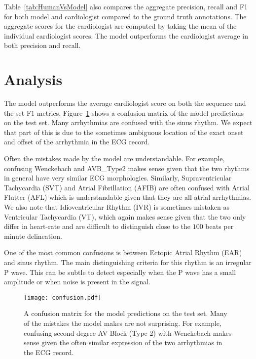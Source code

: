 \documentclass{article}
\begin{document}
Table~\ref{tab:HumanVsModel} also compares the aggregate precision, recall and F1 for both  model and cardiologist compared to the ground truth annotations. The aggregate scores for the cardiologist are computed by taking the mean of the individual cardiologist scores. The model outperforms the cardiologist average in both precision and recall.


\section{Analysis}
\label{analysis}
The model outperforms the average cardiologist score on both the sequence and the set F1 metrics. Figure~\ref{fig:confusion} shows a confusion matrix of the model predictions on the test set. Many arrhythmias are confused with the sinus rhythm. We expect that part of this is due to the sometimes ambiguous location of the exact onset and offset of the arrhythmia in the ECG record.

Often the mistakes made by the model are understandable. For example, confusing Wenckebach and AVB\_Type2 makes sense given that the two rhythms in general have very similar ECG morphologies. Similarly, Supraventricular Tachycardia (SVT) and Atrial Fibrillation (AFIB) are often confused with Atrial Flutter (AFL) which is understandable given that they are all atrial arrhythmias. We also note that Idioventricular Rhythm (IVR) is sometimes mistaken as Ventricular Tachycardia (VT), which again makes sense given that the two only differ in heart-rate and are difficult to distinguish close to the $100$ beats per minute delineation.

One of the most common confusions is between Ectopic Atrial Rhythm (EAR) and sinus rhythm. The main distinguishing criteria for this rhythm is an irregular P wave. This can be subtle to detect especially when the P wave has a small amplitude or when noise is present in the signal.

\begin{figure}[t]
  \centering
  \texttt{[image: confusion.pdf]}
  \caption{
    A confusion matrix for the model predictions on the test set. Many of the mistakes the model makes are not surprising. For example, confusing second degree AV Block (Type 2) with Wenckebach makes sense given the often similar expression of the two arrhythmias in the ECG record.
  }
  \label{fig:confusion}
\end{figure}
\end{document}
